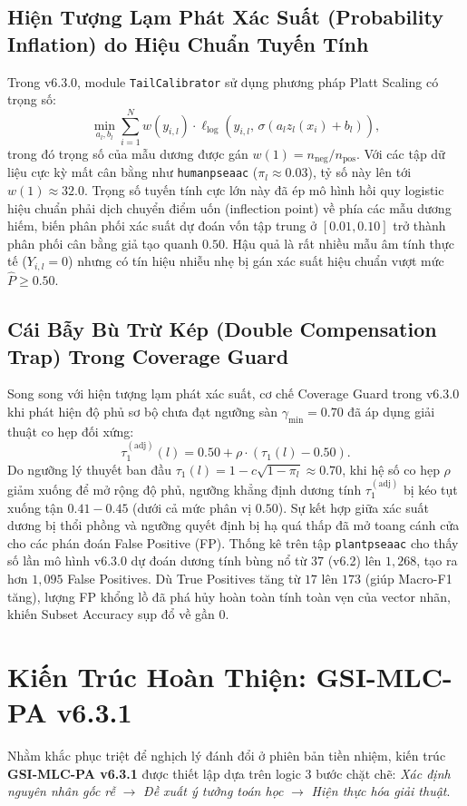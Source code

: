 \documentclass[10pt,a4paper,twoside]{article}
\begin{document}
\subsection{Hiện Tượng Lạm Phát Xác Suất (Probability Inflation) do Hiệu Chuẩn Tuyến Tính}
Trong v6.3.0, module \texttt{TailCalibrator} sử dụng phương pháp Platt Scaling có trọng số:
\begin{equation}
\min_{a_l, b_l} \sum_{i=1}^N w(y_{i, l}) \cdot \ell_{\text{log}}\left(y_{i, l}, \, \sigma(a_l z_l(x_i) + b_l)\right),
\end{equation}
trong đó trọng số của mẫu dương được gán $w(1) = n_{\text{neg}} / n_{\text{pos}}$. Với các tập dữ liệu cực kỳ mất cân bằng như \texttt{humanpseaac} ($\pi_l \approx 0.03$), tỷ số này lên tới $w(1) \approx 32.0$. Trọng số tuyến tính cực lớn này đã ép mô hình hồi quy logistic hiệu chuẩn phải dịch chuyển điểm uốn (inflection point) về phía các mẫu dương hiếm, biến phân phối xác suất dự đoán vốn tập trung ở $[0.01, 0.10]$ trở thành phân phối cân bằng giả tạo quanh $0.50$. Hậu quả là rất nhiều mẫu âm tính thực tế ($Y_{i, l} = 0$) nhưng có tín hiệu nhiễu nhẹ bị gán xác suất hiệu chuẩn vượt mức $\hat{P} \ge 0.50$.

\subsection{Cái Bẫy Bù Trừ Kép (Double Compensation Trap) Trong Coverage Guard}
Song song với hiện tượng lạm phát xác suất, cơ chế Coverage Guard trong v6.3.0 khi phát hiện độ phủ sơ bộ chưa đạt ngưỡng sàn $\gamma_{\min} = 0.70$ đã áp dụng giải thuật co hẹp đối xứng:
\begin{equation}
\tau_1^{(\text{adj})}(l) = 0.50 + \rho \cdot (\tau_1(l) - 0.50).
\end{equation}
Do ngưỡng lý thuyết ban đầu $\tau_1(l) = 1 - c\sqrt{1-\pi_l} \approx 0.70$, khi hệ số co hẹp $\rho$ giảm xuống để mở rộng độ phủ, ngưỡng khẳng định dương tính $\tau_1^{(\text{adj})}$ bị kéo tụt xuống tận $0.41 - 0.45$ (dưới cả mức phân vị $0.50$). Sự kết hợp giữa xác suất dương bị thổi phồng và ngưỡng quyết định bị hạ quá thấp đã mở toang cánh cửa cho các phán đoán False Positive (FP). Thống kê trên tập \texttt{plantpseaac} cho thấy số lần mô hình v6.3.0 dự đoán dương tính bùng nổ từ $37$ (v6.2) lên $1,268$, tạo ra hơn $1,095$ False Positives. Dù True Positives tăng từ $17$ lên $173$ (giúp Macro-F1 tăng), lượng FP khổng lồ đã phá hủy hoàn toàn tính toàn vẹn của vector nhãn, khiến Subset Accuracy sụp đổ về gần $0$.
\section{Kiến Trúc Hoàn Thiện: GSI-MLC-PA v6.3.1}
Nhằm khắc phục triệt để nghịch lý đánh đổi ở phiên bản tiền nhiệm, kiến trúc \textbf{GSI-MLC-PA v6.3.1} được thiết lập dựa trên logic 3 bước chặt chẽ: \textit{Xác định nguyên nhân gốc rễ} $\rightarrow$ \textit{Đề xuất ý tưởng toán học} $\rightarrow$ \textit{Hiện thực hóa giải thuật}.
\end{document}
